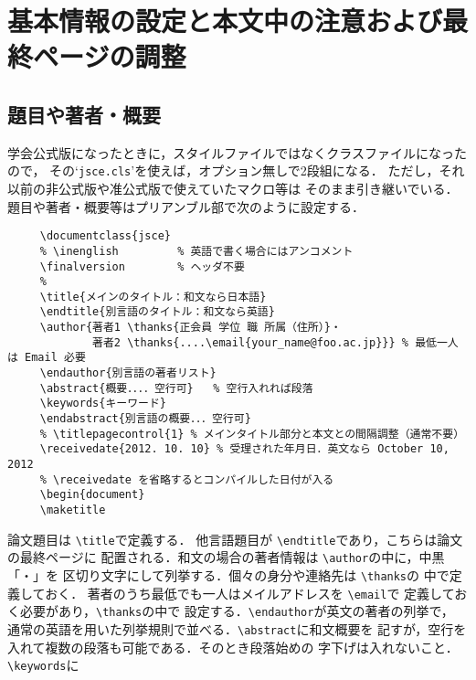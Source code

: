 \documentclass[onecolumn]{jsce}  %
\begin{document}
\section{基本情報の設定と本文中の注意および最終ページの調整}
\label{sec:2}

\subsection{題目や著者・概要}

学会公式版になったときに，スタイルファイルではなくクラスファイルになったので，
その`{\tt jsce.cls}'を使えば，オプション無しで2段組になる．
ただし，それ以前の非公式版や准公式版で使えていたマクロ等は
そのまま引き継いでいる．
題目や著者・概要等はプリアンブル部で次のように設定する．

\renewcommand{\baselinestretch}{0.75}\small\normalsize
\begin{verbatim}
     \documentclass{jsce}
     % \inenglish         % 英語で書く場合にはアンコメント
     \finalversion        % ヘッダ不要
     %
     \title{メインのタイトル：和文なら日本語}
     \endtitle{別言語のタイトル：和文なら英語}
     \author{著者1 \thanks{正会員 学位 職 所属（住所）}・
             著者2 \thanks{....\email{your_name@foo.ac.jp}}} % 最低一人は Email 必要
     \endauthor{別言語の著者リスト}
     \abstract{概要．．．．空行可}   % 空行入れれば段落
     \keywords{キーワード}
     \endabstract{別言語の概要．．．空行可}
     % \titlepagecontrol{1} % メインタイトル部分と本文との間隔調整（通常不要）
     \receivedate{2012. 10. 10} % 受理された年月日．英文なら October 10, 2012
     % \receivedate を省略するとコンパイルした日付が入る
     \begin{document}
     \maketitle
\end{verbatim}
\renewcommand{\baselinestretch}{1}\small\normalsize
%
論文題目は \verb+\title+で定義する．
他言語題目が \verb+\endtitle+であり，こちらは論文の最終ページに
配置される．和文の場合の著者情報は \verb+\author+の中に，中黒「・」を
区切り文字にして列挙する．個々の身分や連絡先は \verb+\thanks+の
中で定義しておく．
著者のうち最低でも一人はメイルアドレスを \verb+\email+で
定義しておく必要があり，\verb+\thanks+の中で
設定する．\verb+\endauthor+が英文の著者の列挙で，
通常の英語を用いた列挙規則で並べる．\verb+\abstract+に和文概要を
記すが，空行を入れて複数の段落も可能である．そのとき段落始めの
字下げは入れないこと．\verb+\keywords+に
\end{document}
